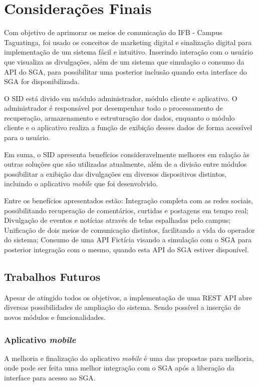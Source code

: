 \chapter[Considerações Finais]{Considerações Finais}
\label{consideracoes}
Com objetivo de aprimorar os meios de comunicação do IFB - Campus Taguatinga, foi usado os conceitos de marketing digital e sinalização digital para implementação de um sistema fácil e intuitivo. Inserindo interação com o usuário que visualiza as divulgações, além de um sistema que simulação o consumo da API do SGA, para possibilitar uma posterior inclusão quando esta interface do SGA for disponibilizada.

O SID está divido em módulo administrador, módulo cliente e aplicativo. O administrador é responsável por desempenhar todo o processamento de recuperação, armazenamento e estruturação dos dados, enquanto o módulo cliente e o aplicativo realiza a função de exibição desses dados de forma acessível para o usuário.  

Em suma, o SID apresenta benefícios consideravelmente melhores em ralação às outras soluções que são utilizadas atualmente, além de a divisão entre módulos possibilitar a exibição das divulgações em diversos dispositivos distintos, incluindo o aplicativo \textit{mobile} que foi desenvolvido.

Entre os benefícios apresentados estão: Integração completa com as redes sociais, possibilitando recuperação de comentários, curtidas e postagens em tempo real; Divulgação de eventos e notícias através de telas espalhadas pelo campus; Unificação de dois meios de comunicação distintos, facilitando a vida do operador do sistema; Consumo de uma API Fictícia visando a simulação com o SGA para posterior integração com o mesmo, quando esta API do SGA estiver disponível.

\section{Trabalhos Futuros}
Apesar de atingido todos os objetivos, a implementação de uma REST API abre diversas possibilidades de ampliação do sistema. Sendo possível a inserção de novos módulos e funcionalidades.

\subsection{Aplicativo \textit{mobile}}
A melhoria e finalização do aplicativo \textit{mobile} é uma das propostas para melhoria, onde pode ser feita uma melhor integração com o SGA após a liberação da interface para acesso ao SGA.


